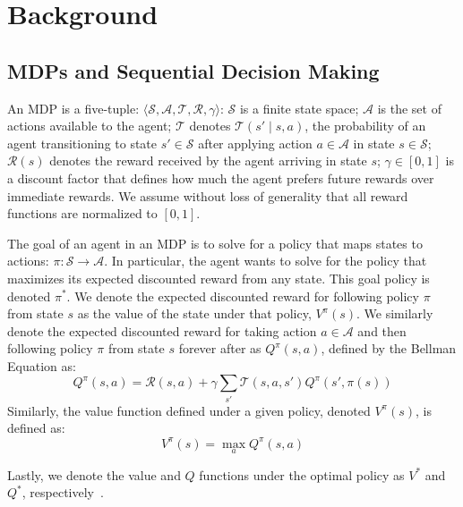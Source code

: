
\section{Background}


\subsection{\acp{MDP} and Sequential Decision Making}
An \ac{MDP} is a five-tuple: $\langle \mathcal{S}, \mathcal{A}, \mathcal{T}, \mathcal{R}, \gamma \rangle$: $\mathcal{S}$ is a finite state space; $\mathcal{A}$ is the set of actions available to the agent; $\mathcal{T}$ denotes $\mathcal{T}(s' \mid s,a)$, the probability of an agent transitioning to state $s' \in \mathcal{S}$ after applying action $a \in \mathcal{A}$ in state $s \in \mathcal{S}$; $\mathcal{R}(s)$ denotes the reward received by the agent arriving in state $s$; $\gamma \in [0, 1]$ is a discount  factor that defines how much the agent prefers future rewards over immediate rewards. We assume without loss of generality that all reward functions are normalized to $[0,1]$.

The goal of an agent in an \ac{MDP} is to solve for a policy that maps states to actions: $\pi: \mathcal{S} \rightarrow \mathcal{A}$. In particular, the agent wants to solve for the policy that maximizes its expected discounted reward from any state. This goal policy is denoted $\pi^*$. We denote the expected discounted reward for following policy $\pi$ from state $s$ as the value of the state under that policy, $V^\pi(s)$. We similarly denote the expected discounted reward for taking action $a \in \mathcal{A}$ and then following policy $\pi$ from state $s$ forever after as $Q^\pi(s,a)$, defined by the Bellman Equation as:
\begin{equation}
Q^\pi(s,a) = \mathcal{R}(s,a) + \gamma \sum_{s'} \mathcal{T}(s,a,s') Q^\pi(s',\pi(s))
\end{equation}
Similarly, the value function defined under a given policy, denoted $V^\pi(s)$, is defined as:
\begin{equation}
V^\pi(s) = \max_a Q^\pi(s,a)
\end{equation}

Lastly, we denote the value and $Q$ functions under the optimal policy as $V^*$ and $Q^*$, respectively~\cite{kaelbling1996reinforcement}.

